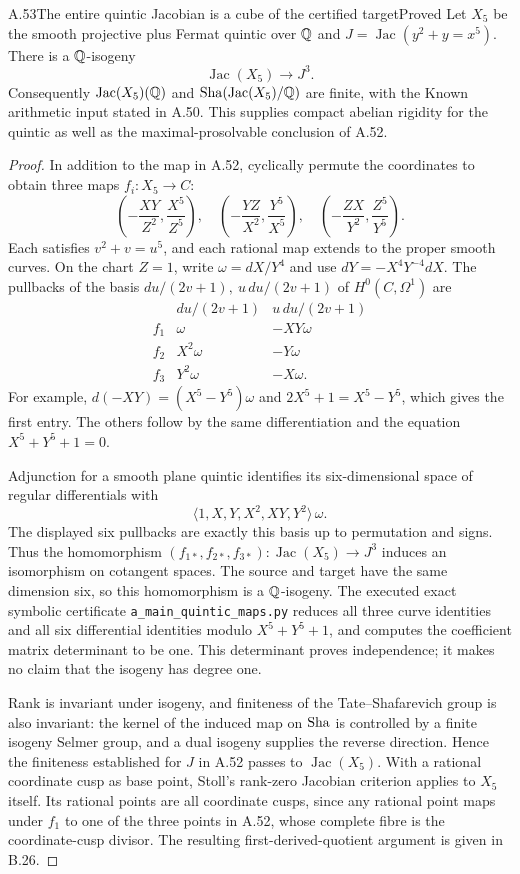 \begin{statement}{A.53}{The entire quintic Jacobian is a cube of the certified target}{Proved}
Let $X_5$ be the smooth projective plus Fermat quintic over $\mathbb Q$ and
$J=\operatorname{Jac}(y^2+y=x^5)$. There is a $\mathbb Q$-isogeny
\[
 \operatorname{Jac}(X_5)\longrightarrow J^3.
\]
Consequently $\operatorname{Jac}(X_5)(\mathbb Q)$ and
$\mathop{\mathrm{Sha}}(\operatorname{Jac}(X_5)/\mathbb Q)$ are finite, with the Known arithmetic
input stated in A.50. This supplies compact abelian rigidity for the
quintic as well as the maximal-prosolvable conclusion of A.52.
\end{statement}
\begin{proof}
In addition to the map in A.52, cyclically permute the coordinates to
obtain three maps $f_i:X_5\to C$:
\[
 \left(-\frac{XY}{Z^2},\frac{X^5}{Z^5}\right),\quad
 \left(-\frac{YZ}{X^2},\frac{Y^5}{X^5}\right),\quad
 \left(-\frac{ZX}{Y^2},\frac{Z^5}{Y^5}\right).
\]
Each satisfies $v^2+v=u^5$, and each rational map extends to the proper
smooth curves. On the chart $Z=1$, write
$\omega=dX/Y^4$ and use
$dY=-X^4Y^{-4}dX$. The pullbacks of the basis
$du/(2v+1),\ u\,du/(2v+1)$ of $H^0(C,\Omega^1)$ are
\[
 \begin{array}{c|cc}
    &du/(2v+1)&u\,du/(2v+1)\\ \hline
 f_1&\omega&-XY\omega\\
 f_2&X^2\omega&-Y\omega\\
 f_3&Y^2\omega&-X\omega.
 \end{array}
\]
For example,
$d(-XY)=(X^5-Y^5)\omega$ and
$2X^5+1=X^5-Y^5$, which gives the first entry. The others follow by
the same differentiation and the equation $X^5+Y^5+1=0$.

Adjunction for a smooth plane quintic identifies its six-dimensional
space of regular differentials with
\[
 \langle 1,X,Y,X^2,XY,Y^2\rangle\,\omega.
\]
The displayed six pullbacks are exactly this basis up to permutation
and signs. Thus the homomorphism
$(f_{1*},f_{2*},f_{3*}):\operatorname{Jac}(X_5)\to J^3$
induces an isomorphism on cotangent spaces. The source and target have
the same dimension six, so this homomorphism is a $\mathbb Q$-isogeny.
The executed exact symbolic certificate
\texttt{a\_main\_quintic\_maps.py} reduces all three curve identities
and all six differential identities modulo $X^5+Y^5+1$, and computes
the coefficient matrix determinant to be one. This determinant proves
independence; it makes no claim that the isogeny has degree one.

Rank is invariant under isogeny, and finiteness of the
Tate--Shafarevich group is also invariant: the kernel of the induced
map on $\mathop{\mathrm{Sha}}$ is controlled by a finite isogeny Selmer group, and a
dual isogeny supplies the reverse direction. Hence the finiteness
established for $J$ in A.52 passes to $\operatorname{Jac}(X_5)$.
With a rational coordinate cusp as base point, Stoll's rank-zero
Jacobian criterion applies to $X_5$ itself. Its rational points are
all coordinate cusps, since any rational point maps under $f_1$ to
one of the three points in A.52, whose complete fibre is the
coordinate-cusp divisor. The resulting first-derived-quotient
argument is given in B.26.
\end{proof}

